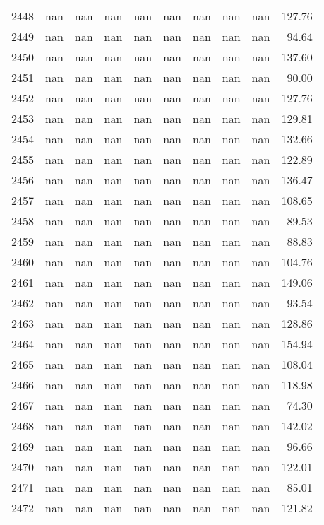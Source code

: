 \begin{tabular}{lrrrrrrrrr}
2448 & nan & nan & nan & nan & nan & nan & nan & nan & 127.76 \\
2449 & nan & nan & nan & nan & nan & nan & nan & nan & 94.64 \\
2450 & nan & nan & nan & nan & nan & nan & nan & nan & 137.60 \\
2451 & nan & nan & nan & nan & nan & nan & nan & nan & 90.00 \\
2452 & nan & nan & nan & nan & nan & nan & nan & nan & 127.76 \\
2453 & nan & nan & nan & nan & nan & nan & nan & nan & 129.81 \\
2454 & nan & nan & nan & nan & nan & nan & nan & nan & 132.66 \\
2455 & nan & nan & nan & nan & nan & nan & nan & nan & 122.89 \\
2456 & nan & nan & nan & nan & nan & nan & nan & nan & 136.47 \\
2457 & nan & nan & nan & nan & nan & nan & nan & nan & 108.65 \\
2458 & nan & nan & nan & nan & nan & nan & nan & nan & 89.53 \\
2459 & nan & nan & nan & nan & nan & nan & nan & nan & 88.83 \\
2460 & nan & nan & nan & nan & nan & nan & nan & nan & 104.76 \\
2461 & nan & nan & nan & nan & nan & nan & nan & nan & 149.06 \\
2462 & nan & nan & nan & nan & nan & nan & nan & nan & 93.54 \\
2463 & nan & nan & nan & nan & nan & nan & nan & nan & 128.86 \\
2464 & nan & nan & nan & nan & nan & nan & nan & nan & 154.94 \\
2465 & nan & nan & nan & nan & nan & nan & nan & nan & 108.04 \\
2466 & nan & nan & nan & nan & nan & nan & nan & nan & 118.98 \\
2467 & nan & nan & nan & nan & nan & nan & nan & nan & 74.30 \\
2468 & nan & nan & nan & nan & nan & nan & nan & nan & 142.02 \\
2469 & nan & nan & nan & nan & nan & nan & nan & nan & 96.66 \\
2470 & nan & nan & nan & nan & nan & nan & nan & nan & 122.01 \\
2471 & nan & nan & nan & nan & nan & nan & nan & nan & 85.01 \\
2472 & nan & nan & nan & nan & nan & nan & nan & nan & 121.82 \\

\end{tabular}
